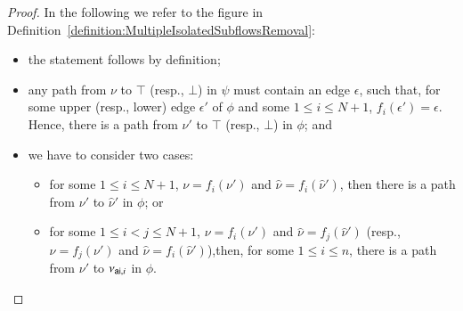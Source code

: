 \begin{proof}
In the following we refer to the figure in Definition~\ref{definition:MultipleIsolatedSubflowsRemoval}:
\begin{itemize}
 \item the statement follows by definition;
 \item any path from $\nu$ to $\top$ (resp., $\bot$) in $\psi$ must contain an edge $\epsilon$, such that, for some upper (resp., lower) edge $\epsilon'$ of $\phi$ and some $1\le i\le N+1$, $f_i(\epsilon')=\epsilon$. Hence, there is a path from $\nu'$ to $\top$ (resp., $\bot$) in $\phi$; and
 \item we have to consider two cases:
 \begin{itemize}
  \item for some $1\le i\le N+1$, $\nu=f_i(\nu')$ and $\hat\nu=f_i(\hat\nu')$, then there is a path from $\nu'$ to $\hat\nu'$ in $\phi$; or
  \item for some $1\le i<j\le N+1$, $\nu=f_i(\nu')$ and $\hat\nu=f_j(\hat\nu')$ (resp., $\nu=f_j(\nu')$ and $\hat\nu=f_i(\hat\nu')$),then, for some $1\le i\le n$, there is a path from $\nu'$ to $\nu_{{\mathsf{ai}},i}$ in $\phi$.
 \end{itemize}
\end{itemize}
\end{proof}

